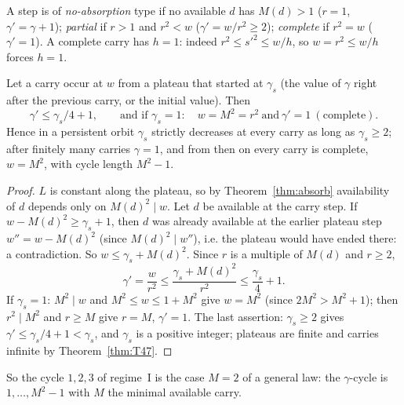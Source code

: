 A step is of \emph{no-absorption} type if no available \(d\) has \(M(d)>1\) (\(r=1\), \(\gamma'=\gamma+1\)); \emph{partial} if \(r>1\) and \(r^2<w\) (\(\gamma'=w/r^2\ge2\)); \emph{complete} if \(r^2=w\) (\(\gamma'=1\)). A complete carry has \(h=1\): indeed \(r^2\le s'^2\le w/h\), so \(w=r^2\le w/h\) forces \(h=1\).

\begin{theorem}\label{thm:carrycomp}
Let a carry occur at \(w\) from a plateau that started at \(\gamma_s\) (the value of \(\gamma\) right after the previous carry, or the initial value). Then
\[
\gamma'\le\gamma_s/4+1,\qquad\text{and if }\gamma_s=1:\quad w=M^2=r^2\ \text{and}\ \gamma'=1\ (\text{complete}).
\]
Hence in a persistent orbit \(\gamma_s\) strictly decreases at every carry as long as \(\gamma_s\ge2\); after finitely many carries \(\gamma=1\), and from then on every carry is complete, \(w=M^2\), with cycle length \(M^2-1\).
\end{theorem}
\begin{proof}
\(L\) is constant along the plateau, so by Theorem~\ref{thm:absorb} availability of \(d\) depends only on \(M(d)^2\mid w\). Let \(d\) be available at the carry step. If \(w-M(d)^2\ge\gamma_s+1\), then \(d\) was already available at the earlier plateau step \(w''=w-M(d)^2\) (since \(M(d)^2\mid w''\)), i.e. the plateau would have ended there: a contradiction. So \(w\le\gamma_s+M(d)^2\). Since \(r\) is a multiple of \(M(d)\) and \(r\ge2\),
\[
\gamma'=\frac w{r^2}\le\frac{\gamma_s+M(d)^2}{r^2}\le\frac{\gamma_s}4+1.
\]
If \(\gamma_s=1\): \(M^2\mid w\) and \(M^2\le w\le1+M^2\) give \(w=M^2\) (since \(2M^2>M^2+1\)); then \(r^2\mid M^2\) and \(r\ge M\) give \(r=M\), \(\gamma'=1\). The last assertion: \(\gamma_s\ge2\) gives \(\gamma'\le\gamma_s/4+1<\gamma_s\), and \(\gamma_s\) is a positive integer; plateaus are finite and carries infinite by Theorem~\ref{thm:T47}.
\end{proof}

So the cycle \(1,2,3\) of regime~I is the case \(M=2\) of a general law: the \(\gamma\)-cycle is \(1,\dots,M^2-1\) with \(M\) the minimal available carry.

